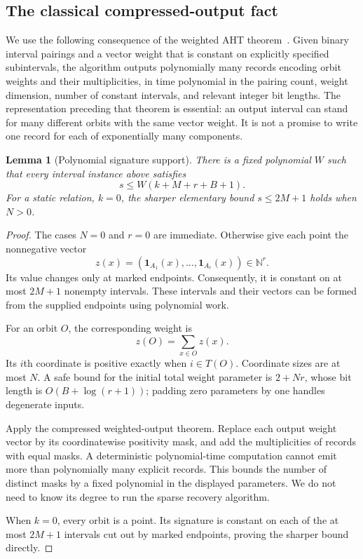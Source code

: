 \documentclass[11pt,letterpaper]{article}
\newtheorem{lemma}[theorem]{Lemma}
\theoremstyle{definition}\newtheorem{definition}[theorem]{Definition}
\theoremstyle{remark}\newtheorem{remark}[theorem]{Remark}
\newcommand{\N}{\mathbb{N}}
\newcommand{\one}{\mathbf{1}}
\begin{document}
\subsection{The classical compressed-output fact}

We use the following consequence of the weighted AHT theorem~\cite[Theorem~16]{aht}. Given binary interval pairings and a vector weight that is constant on explicitly specified subintervals, the algorithm outputs polynomially many records encoding orbit weights and their multiplicities, in time polynomial in the pairing count, weight dimension, number of constant intervals, and relevant integer bit lengths. The representation preceding that theorem is essential: an output interval can stand for many different orbits with the same vector weight. It is not a promise to write one record for each of exponentially many components.

\begin{lemma}[Polynomial signature support]
\label{lem:support}
There is a fixed polynomial $W$ such that every interval instance above satisfies
\[
s\le W(k+M+r+B+1).
\]
For a static relation, $k=0$, the sharper elementary bound $s\le 2M+1$ holds when $N>0$.
\end{lemma}
\begin{proof}
The cases $N=0$ and $r=0$ are immediate. Otherwise give each point the nonnegative vector
\[
z(x)=(\one_{A_1}(x),\ldots,\one_{A_r}(x))\in\N^r.
\]
Its value changes only at marked endpoints. Consequently, it is constant on at most $2M+1$ nonempty intervals. These intervals and their vectors can be formed from the supplied endpoints using polynomial work.

For an orbit $O$, the corresponding weight is
\[
z(O)=\sum_{x\in O}z(x).
\]
Its $i$th coordinate is positive exactly when $i\in T(O)$. Coordinate sizes are at most $N$. A safe bound for the initial total weight parameter is $2+Nr$, whose bit length is $O(B+\log(r+1))$; padding zero parameters by one handles degenerate inputs.

Apply the compressed weighted-output theorem. Replace each output weight vector by its coordinatewise positivity mask, and add the multiplicities of records with equal masks. A deterministic polynomial-time computation cannot emit more than polynomially many explicit records. This bounds the number of distinct masks by a fixed polynomial in the displayed parameters. We do not need to know its degree to run the sparse recovery algorithm.

When $k=0$, every orbit is a point. Its signature is constant on each of the at most $2M+1$ intervals cut out by marked endpoints, proving the sharper bound directly.
\end{proof}
\end{document}

